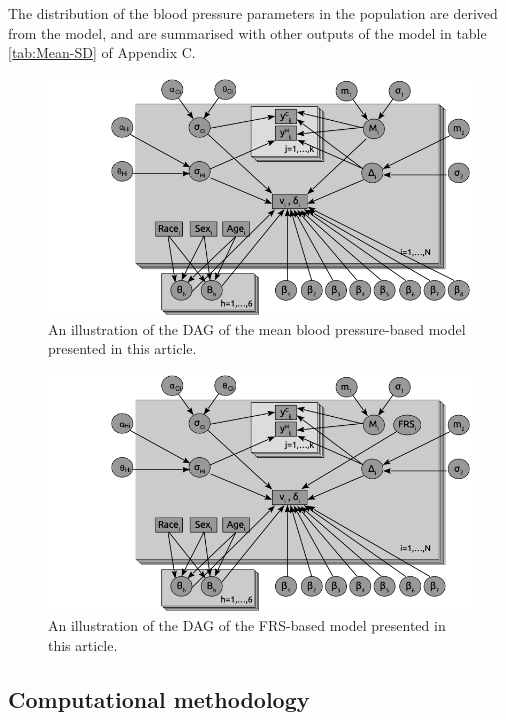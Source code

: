 \documentclass[
]{article}
\begin{document}
The distribution of the blood pressure parameters in the population are derived from the model, and are summarised with other outputs of the model in table \ref{tab:Mean-SD} of Appendix C.

\begin{figure}
\centering
\includegraphics{./DAG_Mean2.png}
\caption{An illustration of the DAG of the mean blood pressure-based model presented in this article.}\label{fig:DAGmean}
\end{figure}

\begin{figure}
\centering
\includegraphics{./DAG_FRS2.png}
\caption{An illustration of the DAG of the FRS-based model presented in this article.}\label{fig:DAGFRS}
\end{figure}

\subsection{Computational methodology}\label{computational-methodology}
\end{document}
